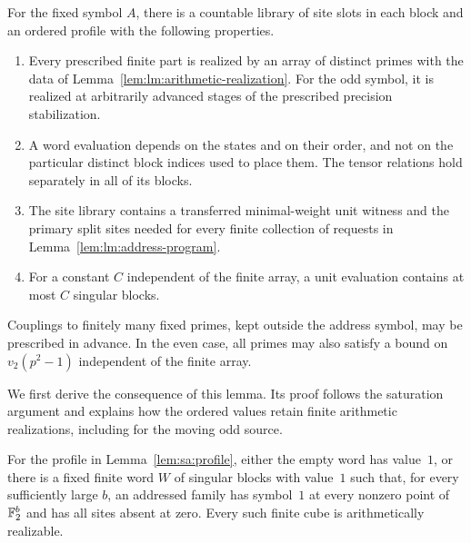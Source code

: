 \begin{lemma}
\label{lem:sa:profile}
For the fixed symbol $A$, there is a countable library of site slots in each block
and an ordered profile with the following
properties.
\begin{enumerate}[label=\textup{(\roman*)}]
\item Every prescribed finite part is realized by an array of distinct
primes with the data of Lemma~\ref{lem:lm:arithmetic-realization}.
For the odd symbol, it is realized at arbitrarily advanced stages of
the prescribed precision stabilization.
\item A word evaluation depends on the states and on their order, and
not on the particular distinct block indices used to place them.
The tensor relations hold separately in all of its blocks.
\item The site library contains a transferred minimal-weight unit witness and
the primary split sites needed for every finite collection of requests
in
Lemma~\ref{lem:lm:address-program}.
\item For a constant $C$ independent of the finite array, a unit
evaluation contains at most $C$ singular blocks.
\end{enumerate}
Couplings to finitely many fixed primes, kept outside the address
symbol, may be prescribed in advance.  In the even case, all primes
may also satisfy a bound on $v_2(p^2-1)$ independent of the finite
array.
\end{lemma}

We first derive the consequence of this lemma. Its proof follows the
saturation argument and explains how the ordered values retain finite
arithmetic realizations, including for the moving odd source.

\begin{lemma}
\label{lem:sa:punctured-cube}
For the profile in Lemma~\ref{lem:sa:profile}, either the empty word
has value~$1$, or there is a fixed finite word $W$ of singular blocks
with value~$1$ such that, for every sufficiently large $b$, an addressed
family has symbol~$1$ at every nonzero point of $\mathbb F_2^b$ and has all
sites absent at zero.  Every such finite cube is arithmetically
realizable.
\end{lemma}

